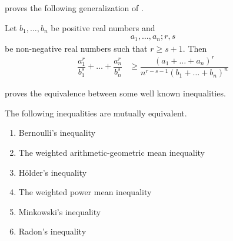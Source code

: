 \documentclass[inequalities.tex]{subfile}
\begin{document}
	\textcite{yang_2002} proves the following generalization of .
		\begin{theorem}\label{thm:genradon}
			Let $b_{1},\ldots,b_{n}$ be positive real numbers and
				\begin{align*}
					a_{1},\ldots,a_{n};r,s
				\end{align*}
			be non-negative real numbers such that $r\geq s+1$. Then
				\begin{align*}
					\dfrac{a_{1}^{r}}{b_{1}^{s}}+\ldots+\dfrac{a_{n}^{r}}{b_{n}^{s}}
						& \geq \dfrac{(a_{1}+\ldots+a_{n})^{r}}{n^{r-s-1}(b_{1}+\ldots+b_{n})^{n}}
				\end{align*}
		\end{theorem}
	\textcite{yongtao_xian_xiao_2018} proves the equivalence between some well known inequalities.
		\begin{theorem}
			The following inequalities are mutually equivalent.
				\begin{enumerate}[\itshape i.]
					\item Bernoulli's inequality
					\item The weighted arithmetic-geometric mean inequality
					\item H\"{o}lder's inequality
					\item The weighted power mean inequality
					\item Minkowski's inequality
					\item Radon's inequality
				\end{enumerate}
		\end{theorem}
\end{document}
